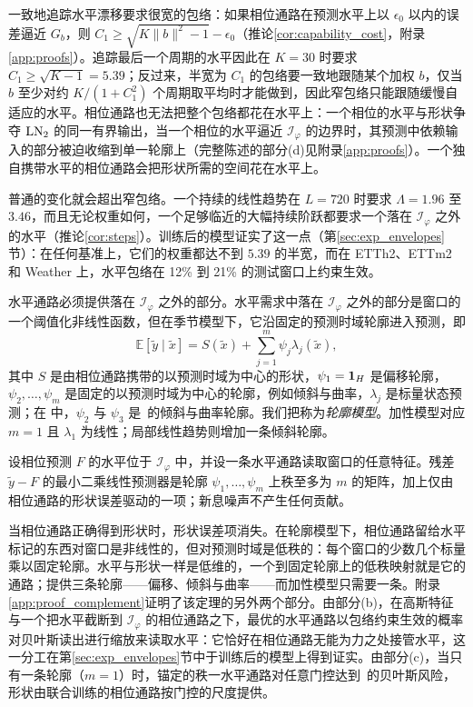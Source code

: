 {
一致地追踪水平漂移要求很宽的包络：如果相位通路在预测水平上以 $\epsilon_0$ 以内的误差逼近 $G_b$，则 $C_1\ge\sqrt{K\|b\|^2-1}-\epsilon_0$（推论\ref{cor:capability_cost}，附录\ref{app:proofs}）。追踪最后一个周期的水平因此在 $K=30$ 时要求 $C_1\ge\sqrt{K-1}=5.39$；反过来，半宽为 $C_1$ 的包络要一致地跟随某个加权 $b$，仅当 $b$ 至少对约 $K/(1+C_1^2)$ 个周期取平均时才能做到，因此窄包络只能跟随缓慢自适应的水平。相位通路也无法把整个包络都花在水平上：一个相位的水平与形状争夺 $\operatorname{LN}_2$ 的同一有界输出，当一个相位的水平逼近 $\mathcal I_\varphi$ 的边界时，其预测中依赖输入的部分被迫收缩到单一轮廓上（完整陈述的部分(d)见附录\ref{app:proofs}）。一个独自携带水平的相位通路会把形状所需的空间花在水平上。

普通的变化就会超出窄包络。一个持续的线性趋势在 $L=720$ 时要求 $\Lambda=1.96$ 至 $3.46$，而且无论权重如何，一个足够临近的大幅持续阶跃都要求一个落在 $\mathcal I_\varphi$ 之外的水平（推论\ref{cor:steps}）。训练后的模型证实了这一点（第\ref{sec:exp_envelopes}节）：在任何基准上，它们的权重都达不到 $5.39$ 的半宽，而在 ETTh2、ETTm2 和 Weather 上，水平包络在 12\% 到 21\% 的测试窗口上约束生效。

水平通路必须提供落在 $\mathcal I_\varphi$ 之外的部分。水平需求中落在 $\mathcal I_\varphi$ 之外的部分是窗口的一个阈值化非线性函数，但在季节模型下，它沿固定的预测时域轮廓进入预测，即
\begin{equation}
\mathbb E[\tilde y\mid\tilde x]=S(\tilde x)+\textstyle\sum_{j=1}^m \psi_j\lambda_j(\tilde x),
\label{eq:profile_model}
\end{equation}
其中 $S$ 是由相位通路携带的以预测时域为中心的形状，$\psi_1=\mathbf 1_H$ 是偏移轮廓，$\psi_2,\dots,\psi_m$ 是固定的以预测时域为中心的轮廓，例如倾斜与曲率，$\lambda_j$ 是标量状态预测；在 \sysplus 中，$\psi_2$ 与 $\psi_3$ 是~的倾斜与曲率轮廓。我们把称为\emph{轮廓模型}。加性模型对应 $m=1$ 且 $\lambda_1$ 为线性；局部线性趋势则增加一条倾斜轮廓。

\begin{theorem}[水平的低秩结构]
\label{thm:complement}
设相位预测 $F$ 的水平位于 $\mathcal I_\varphi$ 中，并设一条水平通路读取窗口的任意特征。残差 $\tilde y-F$ 的最小二乘线性预测器是轮廓 $\psi_1,\dots,\psi_m$ 上秩至多为 $m$ 的矩阵，加上仅由相位通路的形状误差驱动的一项；新息噪声不产生任何贡献。
\end{theorem}

当相位通路正确得到形状时，形状误差项消失。在轮廓模型下，相位通路留给水平标记的东西对窗口是非线性的，但对预测时域是低秩的：每个窗口的少数几个标量乘以固定轮廓。水平与形状一样是低维的，一个到固定轮廓上的低秩映射就是它的通路；\sysplus 提供三条轮廓——偏移、倾斜与曲率——而加性模型只需要一条。附录\ref{app:proof_complement}证明了该定理的另外两个部分。由部分(b)，在高斯特征与一个把水平截断到 $\mathcal I_\varphi$ 的相位通路之下，最优的水平通路以包络约束生效的概率对贝叶斯读出进行缩放来读取水平：它恰好在相位通路无能为力之处接管水平，这一分工在第\ref{sec:exp_envelopes}节中于训练后的模型上得到证实。由部分(c)，当只有一条轮廓（$m=1$）时，锚定的秩一水平通路对任意门控达到~的贝叶斯风险，形状由联合训练的相位通路按门控的尺度提供。

}
